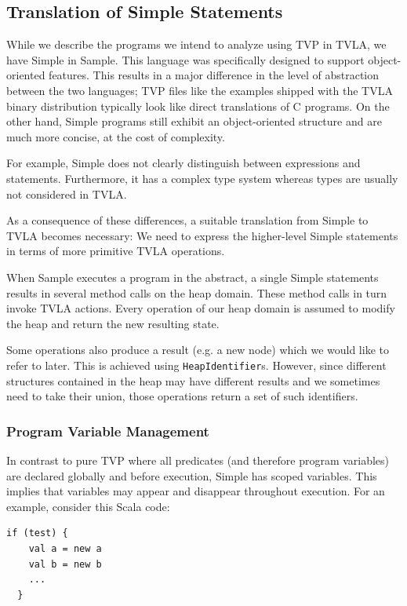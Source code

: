 \documentclass[11pt,a4paper,english]{article}
\begin{document}
\subsection{Translation of Simple Statements}
While we describe the programs we intend to analyze using TVP in TVLA, we have
Simple in Sample. This language was specifically designed to support
object-oriented features. This results in a major difference in the level of
abstraction between the two languages; TVP files like the examples shipped with
the TVLA binary distribution typically look like direct translations of C
programs. On the other hand, Simple programs still exhibit an object-oriented
structure and are much more concise, at the cost of complexity.

For example, Simple does not clearly distinguish between expressions and
statements. Furthermore, it has a complex type system whereas types are
usually not considered in TVLA. 

As a consequence of these differences, a suitable translation from Simple to
TVLA becomes necessary: We need to express the higher-level Simple statements in
terms of more primitive TVLA operations.

When Sample executes a program in the abstract, a single Simple statements
results in several method calls on the heap domain. These method calls in turn
invoke TVLA actions. Every operation of our heap domain is assumed to modify the
heap and return the new resulting state. 

Some operations also produce a result (e.g. a new node) which we would like to
refer to later. This is achieved using \texttt{HeapIdentifier}s.  However, since
different structures contained in the heap may have different results and we
sometimes need to take their union, those operations return a set of such
identifiers.




\subsubsection{Program Variable Management}
In contrast to pure TVP where all predicates (and therefore program variables) are
declared globally and before execution, Simple has scoped variables. This
implies that variables may appear and disappear throughout execution. For an
example, consider this Scala code:

\begin{lstlisting}[caption={scoped variables},label=lst:varscopes]
  if (test) {
    val a = new a
    val b = new b
    ...
  }
\end{lstlisting}
\end{document}
